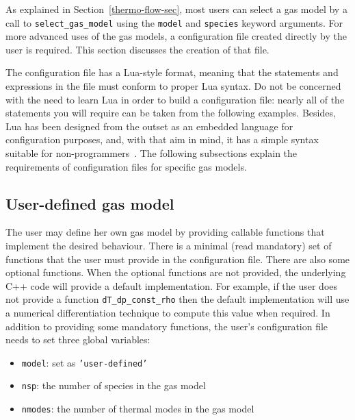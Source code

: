 As explained in Section~\ref{thermo-flow-sec}, most users
can select a gas model by a call to \texttt{select\_gas\_model}
using the \texttt{model} and \texttt{species} keyword arguments.
For more advanced uses of the gas models, a configuration file
created directly by the user is required.
This section discusses the creation of that file.

The configuration file has a Lua-style format, meaning
that the statements and expressions in the file must conform
to proper Lua syntax.
Do not be concerned with the need to learn Lua in order to
build a configuration file: nearly all of the statements
you will require can be taken from the following examples.
Besides, Lua has been designed from the outset as an embedded
language for configuration purposes, and, with that aim in mind,
it has a simple syntax suitable for non-programmers~\cite{ierusalimschy_etal_1996}.
The following subsections explain the requirements of configuration
files for specific gas models.

\subsection{User-defined gas model}
The user may define her own gas model by providing
callable functions that implement the desired behaviour.
There is a minimal (read mandatory) set of functions
that the user must provide in the configuration file.
There are also some optional functions.
When the optional functions are not provided, the
underlying C++ code will provide a default implementation.
For example, if the user does not provide a function \texttt{dT\_dp\_const\_rho}
then the default implementation will use a numerical differentiation
technique to compute this value when required.
In addition to providing some mandatory functions, the user's
configuration file needs to set three global variables:
\begin{itemize}
 \item \texttt{model}: set as \texttt{'user-defined'}
 \item \texttt{nsp}: the number of species in the gas model
 \item \texttt{nmodes}: the number of thermal modes in the gas model
\end{itemize}

